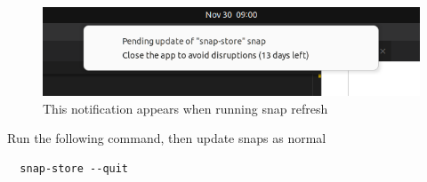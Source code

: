 \documentclass[a4paper, 12pt]{article}
\begin{document}
\begin{figure}[h]
  \centering
  \includegraphics[width=0.6\linewidth]{images/snap_error.png}
  \caption{This notification appears when running snap refresh}
\end{figure}

Run the following command, then update snaps as normal

\begin{lstlisting}
  snap-store --quit
\end{lstlisting}

\printbibliography
\end{document}

